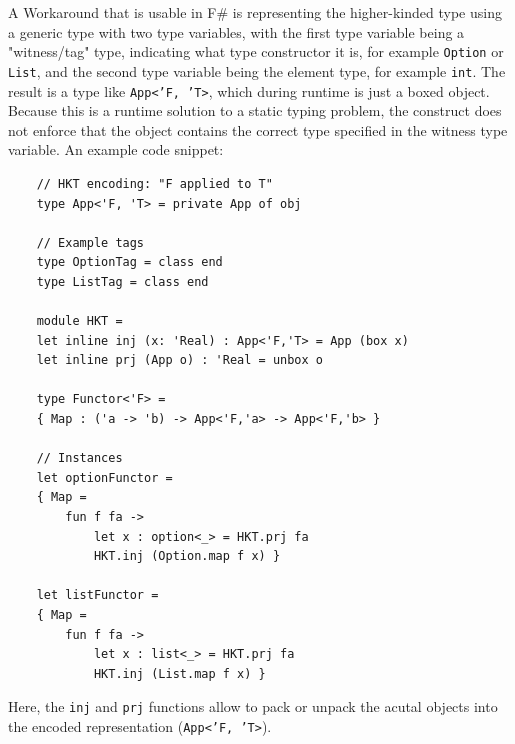 \documentclass[12pt,oneside,a4paper]{article}
\begin{document}
A Workaround that is usable in F\# is representing the higher-kinded type using a generic type with two type variables, with the first type variable being a "witness/tag" type, indicating what type constructor it is, for example \texttt{Option} or \texttt{List}, and the second type variable being the element type, for example \texttt{int}. The result is a type like \texttt{App<'F, 'T>}, which during runtime is just a boxed object. Because this is a runtime solution to a static typing problem, the construct does not enforce that the object contains the correct type specified in the witness type variable. An example code snippet:
\begin{lstlisting}
    // HKT encoding: "F applied to T"
    type App<'F, 'T> = private App of obj

    // Example tags
    type OptionTag = class end
    type ListTag = class end

    module HKT =
    let inline inj (x: 'Real) : App<'F,'T> = App (box x)
    let inline prj (App o) : 'Real = unbox o

    type Functor<'F> =
    { Map : ('a -> 'b) -> App<'F,'a> -> App<'F,'b> }

    // Instances
    let optionFunctor =
    { Map =
        fun f fa ->
            let x : option<_> = HKT.prj fa
            HKT.inj (Option.map f x) }

    let listFunctor =
    { Map =
        fun f fa ->
            let x : list<_> = HKT.prj fa
            HKT.inj (List.map f x) }
\end{lstlisting}
Here, the \texttt{inj} and \texttt{prj} functions allow to pack or unpack the acutal objects into the encoded representation (\texttt{App<'F, 'T>}).
\end{document}

